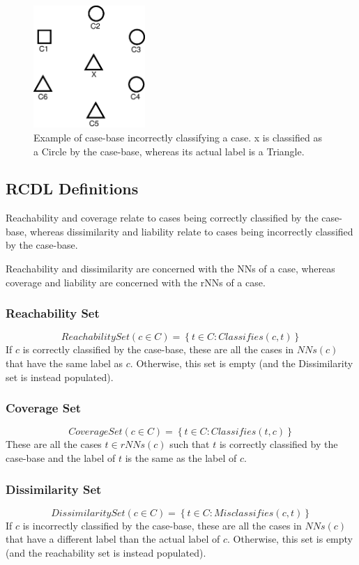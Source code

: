 \documentclass[a4paper,11pt]{report}
\begin{document}
\begin{figure}[h!] \centering
\includegraphics[width=120pt]{./Drawn/EqualDistanceMisclassifiesEg}
\caption{Example of case-base incorrectly classifying a case. x is classified as a Circle by the case-base, whereas its actual label is a Triangle.}
\label{fig:equaldistancemisclassifieseg}
\end{figure}

\subsection{RCDL Definitions}
Reachability and coverage relate to cases being correctly classified by the case-base, whereas dissimilarity and liability relate to cases being incorrectly classified by the case-base.

Reachability and dissimilarity are concerned with the NNs of a case, whereas coverage and liability are concerned with the rNNs of a case.

\subsubsection{Reachability Set}
\[ ReachabilitySet(c \in C) = \left\lbrace t \in C : Classifies(c, t) \right\rbrace \] 
If $c$ is correctly classified by the case-base, these are all the cases in $ NNs(c) $ that have the same label as $c$. Otherwise, this set is empty (and the Dissimilarity set is instead populated).

\subsubsection{Coverage Set}
\[ CoverageSet(c \in C) = \left\lbrace t \in C : Classifies(t, c) \right\rbrace \]
These are all the cases $ t \in rNNs(c) $ such that $t$ is correctly classified by the case-base and the label of $t$ is the same as the label of $c$.

\subsubsection{Dissimilarity Set}
\[ DissimilaritySet(c \in C) = \left\lbrace t \in C : Misclassifies(c, t) \right\rbrace \]  
If $c$ is incorrectly classified by the case-base, these are all the cases in $ NNs(c) $ that have a different label than the actual label of $c$. Otherwise, this set is empty (and the reachability set is instead populated).
\end{document}
